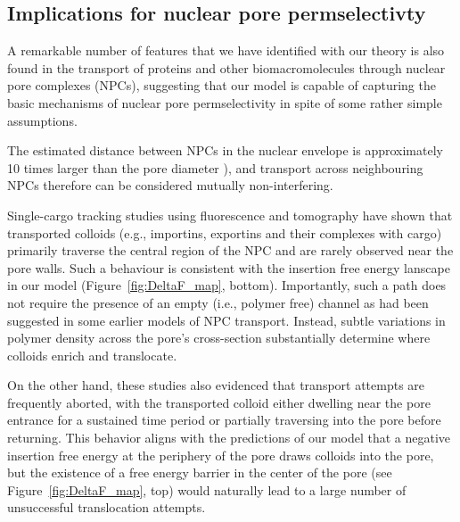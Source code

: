 \documentclass[12pt, a4paper]{article}
\begin{document}
\bigskip



\subsection{Implications for nuclear pore permselectivty}

A remarkable number of features that we have identified with our theory is also found in the transport of proteins and other biomacromolecules through nuclear pore complexes (NPCs), suggesting that our model is capable of capturing the basic mechanisms of nuclear pore permselectivity in spite of some rather simple assumptions.

The estimated distance between NPCs in the nuclear envelope is approximately 10 times larger than the pore diameter \cite{Yang2004, Daigle2001, Feldherr1984, Kubitscheck2000}), and transport across neighbouring NPCs therefore can be considered mutually non-interfering. 

Single-cargo tracking studies using fluorescence \cite{Musser2016, Lowe2010, Lowe2015, Yang2004, Kubitscheck2000, Ma2010} and tomography \cite{Beck2007} have shown that transported colloids (e.g., importins, exportins and their complexes with cargo) primarily traverse the central region of the NPC and are rarely observed near the pore walls.
Such a behaviour is consistent with the  insertion free energy lanscape in our model (Figure~\ref{fig:DeltaF_map}, bottom).
Importantly, such a path does not require the presence of an empty (i.e., polymer free) channel as had been suggested in some earlier models of NPC transport. Instead, subtle variations in polymer density across the pore's cross-section substantially determine where colloids enrich and translocate.  

On the other hand, these studies also evidenced that transport attempts are frequently aborted, with the transported colloid either dwelling near the pore entrance for a sustained time period or partially traversing into the pore before returning.
This behavior aligns with the predictions of our model that a negative insertion free energy at the periphery of the pore draws colloids into the pore, but the existence of a free energy barrier in the center of the pore (see Figure~\ref{fig:DeltaF_map}, top) would naturally lead to a large number of unsuccessful translocation attempts.
\end{document}
